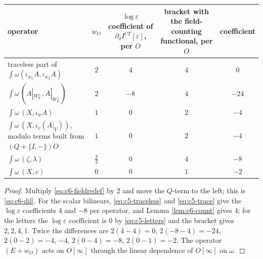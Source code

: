 \begin{theorem}
\begin{tabular}{l|c|c|c|c}
operator & $w_O$ & $\log\varepsilon$ coefficient of $\partial_\delta I^{CT}[\varepsilon]$, per $O$ & bracket with the field-counting functional, per $O$ & coefficient \\
\hline
traceless part of $\int\omega(\iota_{w_1}A,\iota_{w_2}A)$ & $2$ & $4$ & $4$ & $0$ \\
$\int\omega\,(A|_{W_{\mathbb R}^\perp},A|_{W_{\mathbb R}^\perp})$ & $2$ & $-8$ & $4$ & $-24$ \\
$\int\omega\,(X,\iota_wA)$ & $1$ & $0$ & $2$ & $-4$ \\
$\int\omega\,(X,\iota_v(A|_V))$, modulo terms built from $(Q+\{I,-\})O$ & $1$ & $0$ & $2$ & $-4$ \\
$\int\omega\,(\zeta,\lambda)$ & $\tfrac32$ & $0$ & $4$ & $-8$ \\
$\int\omega\,(X,c)$ & $0$ & $0$ & $1$ & $-2$ \\
\end{tabular}
\end{theorem}

\begin{proof}
Multiply \eqref{eq:c6-fieldredef} by $2$ and move the $Q$-term to the left; this is \eqref{eq:c6-dil}. For the scalar bilinears, \eqref{eq:c5-traceless} and \eqref{eq:c5-trace} give the $\log\varepsilon$ coefficients $4$ and $-8$ per operator, and Lemma \ref{lem:c6-count} gives $4$; for the letters the $\log\varepsilon$ coefficient is $0$ by \eqref{eq:c5-letters} and the bracket gives $2,2,4,1$. Twice the differences are $2(4-4)=0$, $2(-8-4)=-24$, $2(0-2)=-4$, $-4$, $2(0-4)=-8$, $2(0-1)=-2$. The operator $(E+w_O)$ acts on $O[\infty]$ through the linear dependence of $O[\infty]$ on $\omega$.
\end{proof}


